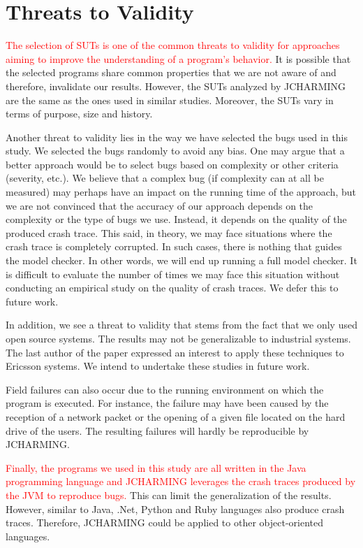 \documentclass[times, doublespace]{smrauth}
\newcommand{\red}[1]{\textcolor{red}{#1}}
\begin{document}
\section{Threats to Validity\label{sec:threats}}

\red{The selection of SUTs is one of the common threats to validity
for approaches aiming to improve the understanding of a
program's behavior.} It is possible that the selected programs
share common properties that we are not aware of and
therefore, invalidate our results. However, the SUTs analyzed
by JCHARMING are the same as the ones used in similar
studies. Moreover, the SUTs vary in terms of purpose, size
and history.

Another threat to validity lies in the way we have selected the
bugs used in this study. We selected the bugs randomly to
avoid any bias. One may argue that a better approach would
be to select bugs based on complexity or other criteria
(severity, etc.). We believe that a complex bug (if complexity
can at all be measured) may perhaps have an impact on the
running time of the approach, but we are not convinced that
the accuracy of our approach depends on the complexity or the
type of bugs we use. Instead, it depends on the quality of the
produced crash trace. This said, in theory, we may face situations where the crash trace is completely corrupted. In such cases, there is nothing that guides the model checker. In other words, we will end up
running a full model checker. It is difficult to evaluate the number of times we may face this situation without conducting an empirical study on the quality of crash traces. We defer this to future work.

In addition, we see a threat to validity that stems from the fact
that we only used open source systems. The results may not be
generalizable to industrial systems. The last author of the
paper expressed an interest to apply these techniques to
Ericsson systems. We intend to undertake these studies in
future work.

Field failures can also occur due to the running environment
on which the program is executed. For instance, the failure
may have been caused by the reception of a network packet or
the opening of a given file located on the hard drive of the
users. The resulting failures will hardly be reproducible by
JCHARMING.

\red{Finally, the programs we used in this study are all written in
the Java programming language and JCHARMING leverages
the crash traces produced by the JVM to reproduce bugs.} This
can limit the generalization of the results. However, similar to
Java, .Net, Python and Ruby languages also produce crash
traces. Therefore, JCHARMING could be applied to other
object-oriented languages.
\end{document}
